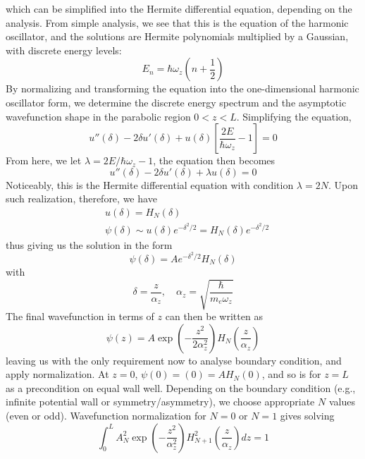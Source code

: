 \documentclass[%
 reprint,
 amsmath,amssymb,
 aps,
]{revtex4-2}
\begin{document}
which can be simplified into the Hermite differential equation, depending on the analysis. From simple analysis, we see that this is the equation of the harmonic oscillator, and the solutions are Hermite polynomials multiplied by a Gaussian, with discrete energy levels:
\begin{equation}
    E_n = \hbar \omega_z \left(n + \frac{1}{2}\right)
\end{equation}
By normalizing and transforming the equation into the one-dimensional harmonic oscillator form, we determine the discrete energy spectrum and the asymptotic wavefunction shape in the parabolic region $0 < z < L$. Simplifying the equation,
\begin{equation}
    u''(\delta) - 2\delta u'(\delta) + u(\delta) \left[ \frac{2E}{\hbar \omega_z} - 1 \right] = 0
\end{equation}
From here, we let $\lambda = 2E/\hbar \omega_z - 1$, the equation then becomes
\begin{equation}
    u''(\delta) - 2\delta u'(\delta) + \lambda u(\delta) = 0
\end{equation}
Noticeably, this is the Hermite differential equation with condition $\lambda = 2N$. Upon such realization, therefore, we have
\begin{align}
    &u(\delta) = H_N(\delta)\\
    &\psi(\delta) \sim u(\delta) e^{-\delta^2/2} = H_N(\delta) e^{-\delta^2/2}
\end{align}
thus giving us the solution in the form
\begin{equation}
    \psi(\delta) = A e^{-\delta^2/2} H_N(\delta)
\end{equation}
with
\begin{equation}
    \delta = \frac{z}{\alpha_z}, \quad \alpha_z = \sqrt{\frac{\hbar}{m_e \omega_z}}
\end{equation}
The final wavefunction in terms of $z$ can then be written as
\begin{equation}
    \psi(z)= A \exp\left(-\frac{z^2}{2\alpha_z^2}\right) H_N\left(\frac{z}{\alpha_z}\right)
\end{equation}
leaving us with the only requirement now to analyse boundary condition, and apply normalization. At $z=0$, $\psi(0)=(0) = A H_N(0)$, and so is for $z=L$ as a precondition on equal wall well. Depending on the boundary condition (e.g., infinite potential wall or symmetry/asymmetry), we choose appropriate $N$ values (even or odd). Wavefunction normalization for $N=0$ or $N=1$ gives solving
\begin{equation}
    \int_0^L A_N^2 \exp\left(-\frac{z^2}{\alpha_z^2}\right) H_{N+1}^2\left( \frac{z}{\alpha_z} \right) dz = 1
\end{equation}
\end{document}
